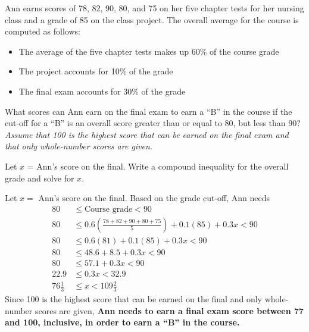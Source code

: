 \documentclass{ximera}
\begin{document}
\begin{problem}
Ann earns scores of 78, 82, 90, 80, and 75 on her five chapter tests for her nursing class
and a grade of 85 on the class project. The overall average for the course is computed as follows:
\begin{itemize}
  \item The average of the five chapter tests makes up 60\% of the course grade
  \item The project accounts for 10\% of the grade
  \item The final exam accounts for 30\% of the grade
\end{itemize}
What scores can Ann earn on the final exam to earn a ``B'' in the course if the cut-off for a
``B'' is an overall score greater than or equal to 80, but less than 90? \textit{Assume that 100
is the highest score that can be earned on the final exam and that only whole-number scores
are given.}
\begin{hint}
Let $x$ = Ann's score on the final. Write a compound inequality for the overall grade and solve for $x$.
\end{hint}
\begin{solution}
Let $x = $ Ann's score on the final. Based on the grade cut-off, Ann needs
\begin{align*}
  80 &\leq \text{Course grade} < 90\\
  80 &\leq 0.6\!\left(\frac{78+82+90+80+75}{5}\right) + 0.1(85) + 0.3x < 90\\
  80 &\leq 0.6(81) + 0.1(85) + 0.3x < 90\\
  80 &\leq 48.6 + 8.5 + 0.3x < 90\\
  80 &\leq 57.1 + 0.3x < 90\\
  22.9 &\leq 0.3x < 32.9\\
  76\tfrac{1}{3} &\leq x < 109\tfrac{2}{3}
\end{align*}
Since 100 is the highest score that can be earned on the final and only whole-number scores
are given, \textbf{Ann needs to earn a final exam score between 77 and 100, inclusive, in order
to earn a ``B'' in the course.}
\end{solution}
\end{problem}
\end{document}
